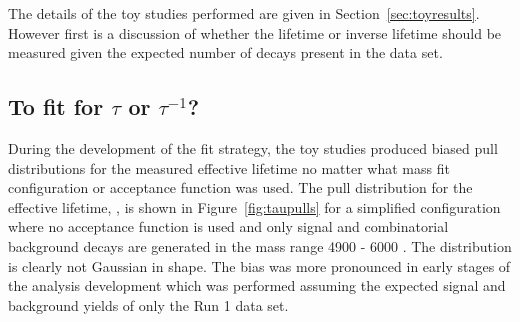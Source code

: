{ The details of the toy studies performed are given in Section~\ref{sec:toyresults}. However first is a discussion of whether the lifetime or inverse lifetime should be measured given the expected number of decays present in the data set.  

\subsection{To fit for $\tau$ or $\tau^{-1}$?}
\label{sec:tauORinvtau}
During the development of the fit strategy, the toy studies produced biased pull distributions for the measured \bsmumu effective lifetime no matter what mass fit configuration or acceptance function was used. The pull distribution for the effective lifetime, \tmumu, is shown in Figure~\ref{fig:taupulls} for a simplified configuration where no acceptance function is used and only signal and combinatorial background decays are generated in the mass range 4900 - 6000 \mevcc. The distribution is clearly not Gaussian in shape. The bias was more pronounced in early stages of the analysis development which was performed assuming the expected signal and background yields of only the Run 1 data set.%

}
